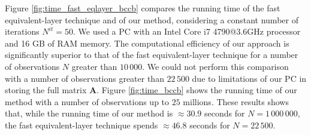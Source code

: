 Figure \ref{fig:time_fast_eqlayer_bccb} compares the running time of the fast equivalent-layer technique 
\citep{siqueira-etal2017} and of our method, considering a constant number of iterations $N^{it} = 50$. 
We used a PC with an Intel Core i7 4790@3.6GHz processor and 16 GB of RAM memory.
The computational efficiency of our approach is significantly superior to that of the 
fast equivalent-layer technique for a number of observations $N$ greater than $10\,000$. 
We could not perform this comparison with a number of observations greater than $22\,500$
due to limitations of our PC in storing the full matrix $\mathbf{A}$.
Figure \ref{fig:time_bccb} shows the running time of our method with a number of observations 
up to  $25$ millions. 
These results shows that, while the running time of our method is $\approx 30.9$ seconds for 
$N = 1\,000\,000$, the fast equivalent-layer technique spends $\approx 46.8$ seconds for $N = 22\,500$.
